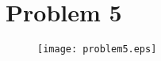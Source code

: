 \documentclass[paper=a4, fontsize=11pt]{scrartcl} %
\numberwithin{equation}{section} %
\numberwithin{figure}{section} %
\numberwithin{table}{section} %
\begin{document}





\section{Problem 5}

\begin{figure}[H]
\begin{center}
\texttt{[image: problem5.eps]}
\end{center}
\end{figure}
\end{document}
